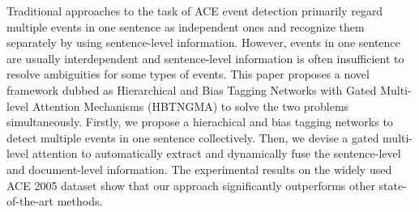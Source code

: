 Traditional approaches to the task of ACE event detection primarily regard multiple events in one sentence as independent ones and recognize them separately by using sentence-level information. However, events in one sentence are usually interdependent and sentence-level information is often insufficient to resolve ambiguities for some types of events. This paper proposes a novel framework dubbed as Hierarchical and Bias Tagging Networks with Gated Multi-level Attention Mechanisms (HBTNGMA) to solve the two problems simultaneously.  Firstly, we propose a hierachical and bias  tagging networks to detect multiple events in one sentence collectively. Then, we devise a gated multi-level attention to automatically extract and  dynamically fuse the sentence-level and document-level information. The experimental results on the widely used ACE 2005 dataset show that our approach significantly outperforms other state-of-the-art methods.
